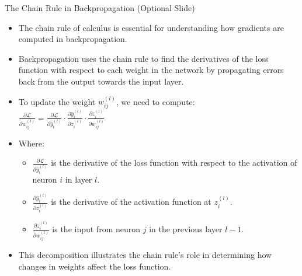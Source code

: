 \documentclass[aspectratio=169]{../latex_main/tntbeamer}  %
\begin{document}
        \begin{frame}{The Chain Rule in Backpropagation (Optional Slide)}

        \vspace{-2em}
        \begin{itemize}
            \item The chain rule of calculus is essential for understanding how gradients are computed in backpropagation.
            \item Backpropagation uses the chain rule to find the derivatives of the loss function with respect to each weight in the network by propagating errors back from the output towards the input layer.
        \end{itemize}
        
        \begin{itemize}
            \item To update the weight \( w_{ij}^{(l)} \), we need to compute:\\
            $
            \frac{\partial \mathcal{L}}{\partial w_{ij}^{(l)}} = \frac{\partial \mathcal{L}}{\partial \hat{y}_i^{(l)}} \cdot \frac{\partial \hat{y}_i^{(l)}}{\partial z_i^{(l)}} \cdot \frac{\partial z_i^{(l)}}{\partial w_{ij}^{(l)}}
            $
            \item Where:
            \begin{itemize}
                \item \( \frac{\partial \mathcal{L}}{\partial \hat{y}_i^{(l)}} \) is the derivative of the loss function with respect to the activation of neuron \( i \) in layer \( l \).
                \item \( \frac{\partial \hat{y}_i^{(l)}}{\partial z_i^{(l)}} \) is the derivative of the activation function at \( z_i^{(l)} \).
                \item \( \frac{\partial z_i^{(l)}}{\partial w_{ij}^{(l)}} \) is the input from neuron \( j \) in the previous layer \( l-1 \).
            \end{itemize}
            \item This decomposition illustrates the chain rule's role in determining how changes in weights affect the loss function.
        \end{itemize}
        
        
        \end{frame}

 	
\end{document}
